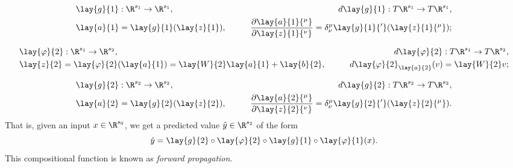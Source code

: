 \begin{align*}
	&\lay{g}{1}:\R^{s_1}\to\R^{s_1},\qquad &
	d\lay{g}{1}:T\R^{s_1}\to T\R^{s_1},\\
	&\lay{a}{1}=\lay{g}{1}(\lay{z}{1}),\qquad 
	&\frac{\partial\lay{a}{1}{^\mu}}{\partial \lay{z}{1}{^\nu}}=\delta^\mu_\nu\lay{g}{1}{'}(\lay{z}{1}{^\mu});
\end{align*}

\begin{align*}
&\lay{\varphi}{2}:\R^{s_1}\to\R^{s_2},\qquad	
&d\lay{\varphi}{2}:T\R^{s_1}\to T\R^{s_2},\\
&\lay{z}{2}=\lay{\varphi}{2}(\lay{a}{1})=\lay{W}{2}\lay{a}{1}+\lay{b}{2},\qquad &d\lay{\varphi}{2}_{\lay{a}{2}}(v)=\lay{W}{2}v;
\end{align*}

\begin{align*}
	&\lay{g}{2}:\R^{s_2}\to\R^{s_2},\qquad 
	&d\lay{g}{2}:T\R^{s_2}\to T\R^{s_2},\\
	&\lay{a}{2}=\lay{g}{2}(\lay{z}{2}),\qquad 
	&\frac{\partial\lay{a}{2}{^\mu}}{\partial \lay{z}{2}{^\nu}}=\delta^\mu_\nu\lay{g}{2}{'}(\lay{z}{2}{^\mu}).
\end{align*}
That is, given an input $x\in\R^{s_0}$, we get a predicted value $\hat{y}\in\R^{s_2}$ of the form
$$\hat{y}=\lay{g}{2}\circ\lay{\varphi}{2}\circ\lay{g}{1}\circ\lay{\varphi}{1}(x).$$
This compositional function is known as \textit{forward propagation}.

